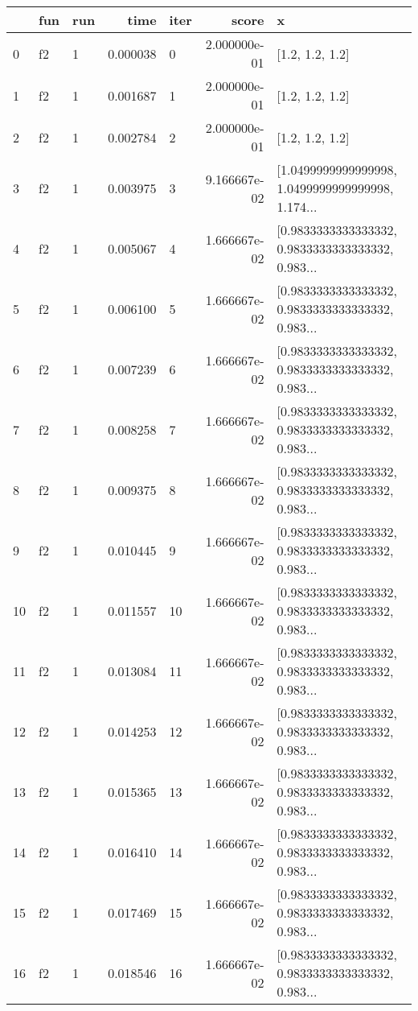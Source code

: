 \begin{tabular}{lllrlrl}
\toprule
{} & fun & run &      time & iter &         score &                                                  x \\
\midrule
0   &  f2 &   1 &  0.000038 &    0 &  2.000000e-01 &                                    [1.2, 1.2, 1.2] \\
1   &  f2 &   1 &  0.001687 &    1 &  2.000000e-01 &                                    [1.2, 1.2, 1.2] \\
2   &  f2 &   1 &  0.002784 &    2 &  2.000000e-01 &                                    [1.2, 1.2, 1.2] \\
3   &  f2 &   1 &  0.003975 &    3 &  9.166667e-02 &  [1.0499999999999998, 1.0499999999999998, 1.174... \\
4   &  f2 &   1 &  0.005067 &    4 &  1.666667e-02 &  [0.9833333333333332, 0.9833333333333332, 0.983... \\
5   &  f2 &   1 &  0.006100 &    5 &  1.666667e-02 &  [0.9833333333333332, 0.9833333333333332, 0.983... \\
6   &  f2 &   1 &  0.007239 &    6 &  1.666667e-02 &  [0.9833333333333332, 0.9833333333333332, 0.983... \\
7   &  f2 &   1 &  0.008258 &    7 &  1.666667e-02 &  [0.9833333333333332, 0.9833333333333332, 0.983... \\
8   &  f2 &   1 &  0.009375 &    8 &  1.666667e-02 &  [0.9833333333333332, 0.9833333333333332, 0.983... \\
9   &  f2 &   1 &  0.010445 &    9 &  1.666667e-02 &  [0.9833333333333332, 0.9833333333333332, 0.983... \\
10  &  f2 &   1 &  0.011557 &   10 &  1.666667e-02 &  [0.9833333333333332, 0.9833333333333332, 0.983... \\
11  &  f2 &   1 &  0.013084 &   11 &  1.666667e-02 &  [0.9833333333333332, 0.9833333333333332, 0.983... \\
12  &  f2 &   1 &  0.014253 &   12 &  1.666667e-02 &  [0.9833333333333332, 0.9833333333333332, 0.983... \\
13  &  f2 &   1 &  0.015365 &   13 &  1.666667e-02 &  [0.9833333333333332, 0.9833333333333332, 0.983... \\
14  &  f2 &   1 &  0.016410 &   14 &  1.666667e-02 &  [0.9833333333333332, 0.9833333333333332, 0.983... \\
15  &  f2 &   1 &  0.017469 &   15 &  1.666667e-02 &  [0.9833333333333332, 0.9833333333333332, 0.983... \\
16  &  f2 &   1 &  0.018546 &   16 &  1.666667e-02 &  [0.9833333333333332, 0.9833333333333332, 0.983... \\

\end{tabular}
